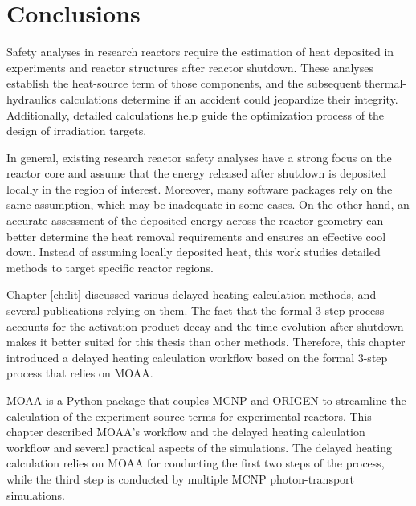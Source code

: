 \section{Conclusions}

Safety analyses in research reactors require the estimation of heat deposited in experiments and reactor structures after reactor shutdown.
These analyses establish the heat-source term of those components, and the subsequent thermal-hydraulics calculations determine if an accident could jeopardize their integrity.
Additionally, detailed calculations help guide the optimization process of the design of irradiation targets.

In general, existing research reactor safety analyses have a strong focus on the reactor core and assume that the energy released after shutdown is deposited locally in the region of interest.
Moreover, many software packages rely on the same assumption, which may be inadequate in some cases.
On the other hand, an accurate assessment of the deposited energy across the reactor geometry can better determine the heat removal requirements and ensures an effective cool down.
Instead of assuming locally deposited heat, this work studies detailed methods to target specific reactor regions.

Chapter \ref{ch:lit} discussed various delayed heating calculation methods, and several publications relying on them.
The fact that the formal 3-step process accounts for the activation product decay and the time evolution after shutdown makes it better suited for this thesis than other methods.
Therefore, this chapter introduced a delayed heating calculation workflow based on the formal 3-step process that relies on MOAA.

MOAA is a Python package that couples MCNP and ORIGEN to streamline the calculation of the experiment source terms for experimental reactors.
This chapter described MOAA's workflow and the delayed heating calculation workflow and several practical aspects of the simulations.
The delayed heating calculation relies on MOAA for conducting the first two steps of the process, while the third step is conducted by multiple MCNP photon-transport simulations.

